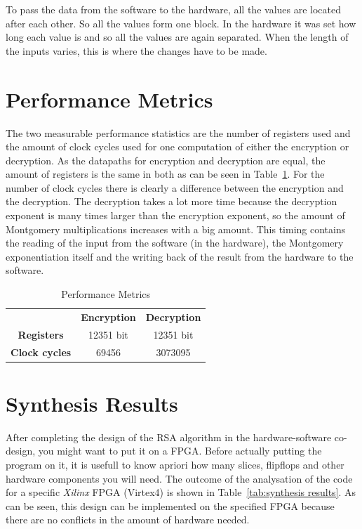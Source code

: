 \documentclass[a4paper]{article}
\begin{document}
To pass the data from the software to the hardware, all the values are located after each other. So all the values form one block. In the hardware it was set how long each value is and so all the values are again separated. When the length of the inputs varies, this is where the changes have to be made.

\section{Performance Metrics}

The two measurable performance statistics are the number of registers used and the amount of clock cycles used for one computation of either the encryption or decryption. As the datapaths for encryption and decryption are equal, the amount of registers is the same in both as can be seen in Table~\ref{tab:performance metrics}. For the number of clock cycles there is clearly a difference between the encryption and the decryption. The decryption takes a lot more time because the decryption exponent is many times larger than the encryption exponent, so the amount of Montgomery multiplications increases with a big amount. This timing contains the reading of the input from the software (in the hardware), the Montgomery exponentiation itself and the writing back of the result from the hardware to the software.

\begin{table}[ht]
	\begin{center}	
		\begin{tabular}{c|c|c}
			 & \textbf{Encryption} & \textbf{Decryption}\\
			\textbf{Registers} & 12351 bit & 12351 bit\\
		 	\textbf{Clock cycles} & 69456 & 3073095\\
		\end{tabular}
	\end{center}
	\caption{Performance Metrics}
	\label{tab:performance metrics}
\end{table} 

\section{Synthesis Results}

After completing the design of the RSA algorithm in the hardware-software co-design, you might want to put it on a FPGA. Before actually putting the program on it, it is usefull to know apriori how many slices, flipflops and other hardware components you will need. The outcome of the analysation of the code for a specific \textit{Xilinx} FPGA (Virtex4) is shown in Table~\ref{tab:synthesis results}. As can be seen, this design can be implemented on the specified FPGA because there are no conflicts in the amount of hardware needed.
\end{document}
